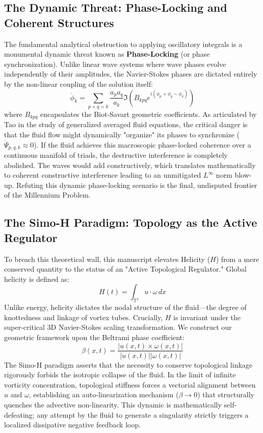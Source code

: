\documentclass[12pt,a4paper]{article}
\theoremstyle{plain}
\theoremstyle{definition}
\theoremstyle{remark}
\begin{document}
\subsection{The Dynamic Threat: Phase-Locking and Coherent Structures}
The fundamental analytical obstruction to applying oscillatory integrals is a monumental dynamic threat known as \textbf{Phase-Locking} (or phase synchronization). Unlike linear wave systems where wave phases evolve independently of their amplitudes, the Navier-Stokes phases are dictated entirely by the non-linear coupling of the solution itself:
\begin{equation}
    \dot{\phi}_k = \sum_{p+q=k} \frac{a_p a_q}{a_k} \Im \left( B_{kpq} e^{i(\phi_p + \phi_q - \phi_k)} \right)
\end{equation}
where $B_{kpq}$ encapsulates the Biot-Savart geometric coefficients. As articulated by Tao \cite{tao2016} in the study of generalized averaged fluid equations, the critical danger is that the fluid flow might dynamically "organize" its phases to synchronize ($\dot{\Psi}_{p,q,k} \approx 0$). If the fluid achieves this macroscopic phase-locked coherence over a continuous manifold of triads, the destructive interference is completely abolished. The waves would add constructively, which translates mathematically to coherent constructive interference leading to an unmitigated $L^\infty$ norm blow-up. Refuting this dynamic phase-locking scenario is the final, undisputed frontier of the Millennium Problem.

\subsection{The Simo-H Paradigm: Topology as the Active Regulator}
To breach this theoretical wall, this manuscript elevates Helicity ($H$) from a mere conserved quantity to the status of an "Active Topological Regulator." Global helicity is defined as:
\begin{equation}
    H(t) = \int_{\mathbb{T}^3} u \cdot \omega \, dx
\end{equation}
Unlike energy, helicity dictates the nodal structure of the fluid—the degree of knottedness and linkage of vortex tubes. Crucially, $H$ is invariant under the super-critical 3D Navier-Stokes scaling transformation. We construct our geometric framework upon the Beltrami phase coefficient:
\begin{equation}
    \beta(x,t) = \frac{|u(x,t) \times \omega(x,t)|}{|u(x,t)||\omega(x,t)|}
\end{equation}
The Simo-H paradigm asserts that the necessity to conserve topological linkage rigorously forbids the isotropic collapse of the fluid. In the limit of infinite vorticity concentration, topological stiffness forces a vectorial alignment between $u$ and $\omega$, establishing an auto-linearization mechanism ($\beta \to 0$) that structurally quenches the advective non-linearity. This dynamic is mathematically self-defeating; any attempt by the fluid to generate a singularity strictly triggers a localized dissipative negative feedback loop.
\end{document}
